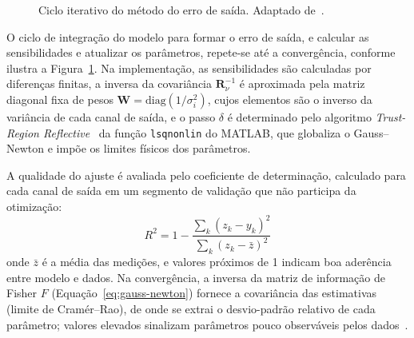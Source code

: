 \documentclass{ieeeaccess}
\begin{document}
\begin{figure}[!t]
{%
}
\caption{Ciclo iterativo do método do erro de saída. Adaptado de~\cite{c2}.}
\label{fig:opt_loop}
\end{figure}

O ciclo de integração do modelo para formar o erro de saída, e calcular as sensibilidades e atualizar os parâmetros, repete-se até a convergência, conforme ilustra a Figura~\ref{fig:opt_loop}. Na implementação, as sensibilidades são calculadas por diferenças finitas, a inversa da covariância $\mathbf{R}_\nu^{-1}$ é aproximada pela matriz diagonal fixa de pesos $\mathbf{W} = \mathrm{diag}(1/\sigma_i^2)$, cujos elementos são o inverso da variância de cada canal de saída, e o passo $\delta$ é determinado pelo algoritmo \textit{Trust-Region Reflective}~\cite{c2} da função \texttt{lsqnonlin} do MATLAB, que globaliza o Gauss--Newton e impõe os limites físicos dos parâmetros.

A qualidade do ajuste é avaliada pelo coeficiente de determinação, calculado para cada canal de saída em um segmento de validação que não participa da otimização:
\begin{equation}
R^2 = 1 - \frac{\sum_{k}(z_k - y_k)^2}{\sum_{k}(z_k - \bar{z})^2}
\label{eq:r2}
\end{equation}
onde $\bar{z}$ é a média das medições, e valores próximos de 1 indicam boa aderência entre modelo e dados. Na convergência, a inversa da matriz de informação de Fisher $F$ (Equação~\eqref{eq:gauss-newton}) fornece a covariância das estimativas (limite de Cramér--Rao), de onde se extrai o desvio-padrão relativo de cada parâmetro; valores elevados sinalizam parâmetros pouco observáveis pelos dados~\cite{c2}.
\end{document}

